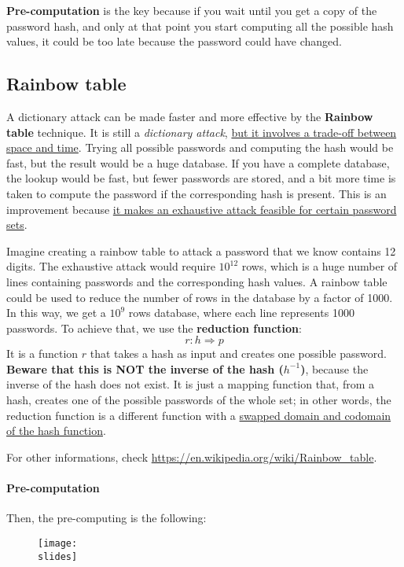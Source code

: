 \textbf{Pre-computation} is the key because if you wait until you get a copy of the password hash, and only at that point you start computing all the possible hash values, it could be too late because the password could have changed.

\subsection{Rainbow table}
A dictionary attack can be made faster and more effective by the \textbf{Rainbow table} technique. It is still a \textit{dictionary attack}, \ul{but it involves a trade-off between space and time}. Trying all possible passwords and computing the hash would be fast, but the result would be a huge database. If you have a complete database, the lookup would be fast, but fewer passwords are stored, and a bit more time is taken to compute the password if the corresponding hash is present. This is an improvement because \ul{it makes an exhaustive attack feasible for certain password sets}.

Imagine creating a rainbow table to attack a password that we know contains 12 digits.
The exhaustive attack would require $10^{12}$ rows, which is a huge number of lines containing passwords and the corresponding hash values.
A rainbow table could be used to reduce the number of rows in the database by a factor of 1000. In this way, we get a $10^9$ rows database, where each line represents 1000 passwords. To achieve that, we use the \textbf{reduction function}:
\[
  r: h \Rightarrow p
\]
It is a function $r$ that takes a hash as input and creates one possible password. \textbf{Beware that this is NOT the inverse of the hash ($h^{-1}$)}, because the inverse of the hash does not exist. It is just a mapping function that, from a hash, creates one of the possible passwords of the whole set; in other words, the reduction function is a different function with a \ul{swapped domain and codomain of the hash function}.

For other informations, check \url{https://en.wikipedia.org/wiki/Rainbow_table}.

\paragraph{Pre-computation}
Then, the pre-computing is the following:

\begin{figure}[h]
  \centering
  \texttt{[image: \\slides]}
\end{figure}

